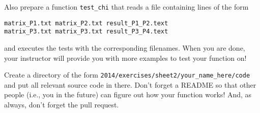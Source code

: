 \documentclass[11pt]{amsart}
\begin{document}
\begin{enumerate}
  Also prepare a function \texttt{test\_chi} that reads a file containing lines of the form 
\begin{verbatim}
matrix_P1.txt matrix_P2.txt result_P1_P2.text
matrix_P3.txt matrix_P3.txt result_P3_P4.text
\end{verbatim}
  and executes the tests with the corresponding filenames. When you
  are done, your instructor will provide you with more examples to test your function on!

  \medskip Create a directory of the form
  \texttt{2014/exercises/sheet2/your\_name\_here/code} and put all
  relevant source code in there. Don't forget a README so that other
  people (i.e., you in the future) can figure out how your function
  works! And, as always, don't forget the pull request.
\end{enumerate}
\end{document}
